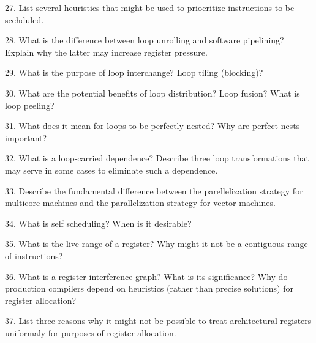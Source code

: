 27. List several heuristics that might be used to prioeritize instructions to be scehduled.

\filbreak
\vskip 1cm

28. What is the difference between loop unrolling and software pipelining? Explain why the latter may increase register pressure.

\filbreak
\vskip 1cm

29. What is the purpose of loop interchange? Loop tiling (blocking)?

\filbreak
\vskip 1cm

30. What are the potential benefits of loop distribution? Loop fusion? What is loop peeling?

\filbreak
\vskip 1cm

31. What does it mean for loops to be perfectly nested? Why are perfect nests important?

\filbreak
\vskip 1cm

32. What is a loop-carried dependence? Describe three loop transformations that may serve in some cases to eliminate such a dependence.

\filbreak
\vskip 1cm

33. Describe the fundamental difference between the parellelization strategy for multicore machines and the parallelization strategy for vector machines.

\filbreak
\vskip 1cm

34. What is self scheduling? When is it desirable?

\filbreak
\vskip 1cm

35. What is the live range of a register? Why might it not be a contiguous range of instructions?

\filbreak
\vskip 1cm

36. What is a register interference graph? What is its significance? Why do production compilers depend on heuristics (rather than precise solutions) for register allocation?

\filbreak
\vskip 1cm

37. List three reasons why it might not be possible to treat architectural registers uniformaly for purposes of register allocation.


\filbreak
\vfill\eject
\bye
